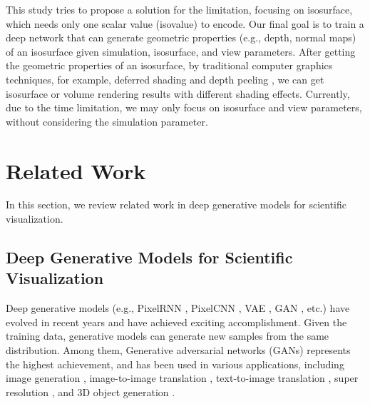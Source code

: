 \documentclass[journal]{vgtc}                %
\begin{document}
This study tries to propose a solution for the limitation, focusing on isosurface, which needs only one scalar value (isovalue) to encode. Our final goal is to train a deep network that can generate geometric properties (e.g., depth, normal maps) of an isosurface given simulation, isosurface, and view parameters. After getting the geometric properties of an isosurface, by traditional computer graphics techniques, for example, deferred shading \cite{deering1988triangle} and depth peeling \cite{zolt2003depthpeel}, we can get isosurface or volume rendering results with different shading effects. Currently, due to the time limitation, we may only focus on isosurface and view parameters, without considering the simulation parameter.  

\section{Related Work}

In this section, we review related work in deep generative models for scientific visualization.

\subsection{Deep Generative Models for Scientific Visualization}

Deep generative models (e.g., PixelRNN \cite{oord2016pixel}, PixelCNN \cite{van2016conditional}, VAE \cite{kingma2013auto}, GAN \cite{goodfellow2014generative}, etc.) have evolved in recent years and have achieved exciting accomplishment. Given the training data, generative models can generate new samples from the same distribution. Among them, Generative adversarial networks \cite{goodfellow2014generative} (GANs) represents the highest achievement, and has been used in various applications, including image generation \cite{karras2017progressive, jin2017towards}, image-to-image translation \cite{isola2017image, zhu2017unpaired}, text-to-image translation \cite{zhang2017stackgan, reed2016generative}, super resolution \cite{ledig2017photo}, and 3D object generation \cite{wu2016learning, gadelha20173d}. 
\end{document}
